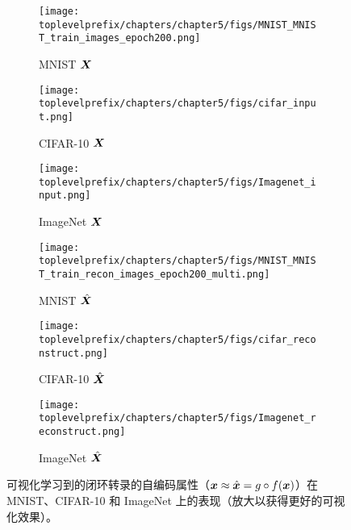 \documentclass[../../book-main.tex]{subfiles}
\begin{document}

\begin{figure}[t]
    \begin{subfigure}[t]{0.3\textwidth}
        \centering
        \texttt{[image: \\toplevelprefix/chapters/chapter5/figs/MNIST\_MNIST\_train\_images\_epoch200.png]}
        \caption{{\small MNIST $\bm{X}$}}
    \end{subfigure}
    \hfill
    \begin{subfigure}[t]{0.3\textwidth}
        \centering
        \texttt{[image: \\toplevelprefix/chapters/chapter5/figs/cifar\_input.png]}
        \caption{{\small CIFAR-10 $\bm{X}$}}
    \end{subfigure}
    \hfill
    \begin{subfigure}[t]{0.3\textwidth}
        \centering
        \texttt{[image: \\toplevelprefix/chapters/chapter5/figs/Imagenet\_input.png]}
        \caption{{\small ImageNet $\bm{X}$}}
    \end{subfigure}

    \begin{subfigure}[t]{0.3\textwidth}
        \centering
        \texttt{[image: \\toplevelprefix/chapters/chapter5/figs/MNIST\_MNIST\_train\_recon\_images\_epoch200\_multi.png]}
        \caption{{\small MNIST $\hat{\bm{X}}$}}
    \end{subfigure}
    \hfill
    \begin{subfigure}[t]{0.3\textwidth}
        \centering
        \texttt{[image: \\toplevelprefix/chapters/chapter5/figs/cifar\_reconstruct.png]}
        \caption{{\small CIFAR-10 $\hat{\bm{X}}$}}
    \end{subfigure}
    \hfill
    \begin{subfigure}[t]{0.3\textwidth}
        \centering
        \texttt{[image: \\toplevelprefix/chapters/chapter5/figs/Imagenet\_reconstruct.png]}
        \caption{{\small ImageNet $\hat{\bm{X}}$}}
    \end{subfigure}
    \caption{可视化学习到的闭环转录的自编码属性（$\bm{x} \approx \hat{\bm{x}} = g\circ f(\bm{x})$）在 MNIST、CIFAR-10 和 ImageNet 上的表现（放大以获得更好的可视化效果）。}
    \label{fig:justifyx=x}
\end{figure}
     
\end{document}
